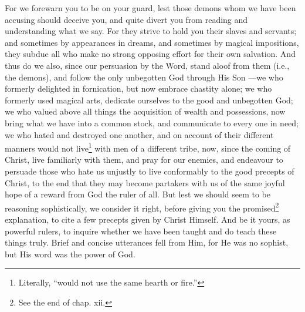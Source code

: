 For we forewarn you to be on your guard, lest those demons whom we have been accusing should deceive you, and quite divert you from reading and understanding what we say. For they strive to hold you their slaves and servants; and sometimes by appearances in dreams, and sometimes by magical impositions, they subdue all who make no strong opposing effort for their own salvation. And thus do we also, since our persuasion by the Word, stand aloof from them (i.e., the demons), and follow the only unbegotten God through His Son —we who formerly delighted in fornication, but now embrace chastity alone; we who formerly used magical arts, dedicate ourselves to the good and unbegotten God; we who valued above all things the acquisition of wealth and possessions, now bring what we have into a common stock, and communicate to every one in need; we who hated and destroyed one another, and on account of their different manners would not live\footnote{Literally, “would not use the same hearth or fire.”} with men of a different tribe, now, since the coming of Christ, live familiarly with them, and pray for our enemies, and endeavour to persuade those who hate us unjustly to live conformably to the good precepts of Christ, to the end that they may become partakers with us of the same joyful hope of a reward from God the ruler of all. But lest we should seem to be reasoning sophistically, we consider it right, before giving you the promised\footnote{See the end of chap. xii.} explanation, to cite a few precepts given by Christ Himself. And be it yours, as powerful rulers, to inquire whether we have been taught and do teach these things truly. Brief and concise utterances fell from Him, for He was no sophist, but His word was the power of God.


